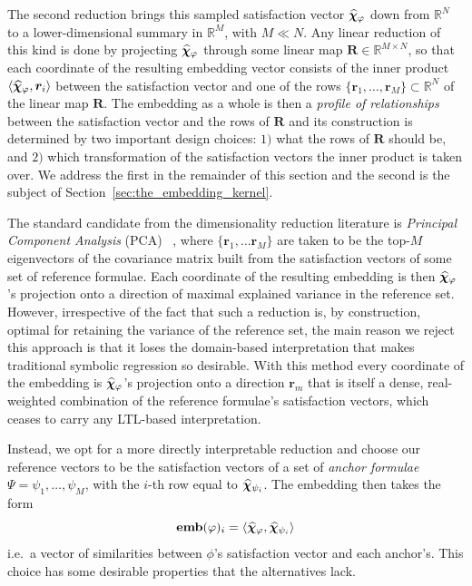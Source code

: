 \documentclass[titlepage,a4paper,11pt]{report}
\begin{document}
    The second reduction brings this sampled satisfaction vector $\bm{\widehat\chi}_\varphi$ down from $\mathbb{R}^N$ to a lower-dimensional summary in $\mathbb{R}^M$, with $M \ll N$. Any linear reduction of this kind is done by projecting $\bm{\widehat\chi}_\varphi$ through some linear map $\bm R \in \mathbb{R}^{M\times N}$, so that each coordinate of the resulting embedding vector consists of the inner product $\langle \bm{\widehat\chi}_\varphi , \bm r_i\rangle$ between the satisfaction vector and one of the rows $\{\bm r_1, \dots, \bm r_M\} \subset \mathbb{R}^N$ of the linear map $\bm R$. The embedding as a whole is then a \emph{profile of relationships} between the satisfaction vector and the rows of $\bm R$ and its construction is determined by two important design choices: $1)$ what the rows of $\bm R$ should be, and $2)$ which transformation of the satisfaction vectors the inner product is taken over. We address the first in the remainder of this section and the second is the subject of Section~\ref{sec:the_embedding_kernel}.

    The standard candidate from the dimensionality reduction literature is \textit{Principal Component Analysis} (PCA) ~\citep{van_der_maaten_dimensionality_2007, hasan_review_2021}, where $\{\bm r_1, \dots \bm r_M \}$ are taken to be the top-$M$ eigenvectors of the covariance matrix built from the satisfaction vectors of some set of reference formulae. Each coordinate of the resulting embedding is then $\bm{\widehat\chi}_\varphi$'s projection onto a direction of maximal explained variance in the reference set. However, irrespective of the fact that such a reduction is, by construction, optimal for retaining the variance of the reference set, the main reason we reject this approach is that it loses the domain-based interpretation that makes traditional symbolic regression so desirable. With this method every coordinate of the embedding is $\bm{\widehat\chi}_\varphi$'s projection onto a direction $\bm r_m$ that is itself a dense, real-weighted combination of the reference formulae's satisfaction vectors, which ceases to carry any LTL-based interpretation.

    Instead, we opt for a more directly interpretable reduction and choose our reference vectors to be the satisfaction vectors of a set of \emph{anchor formulae} $\Psi = {\psi_1, \dots, \psi_M}$, with the $i$-th row equal to $\bm{\widehat\chi}_{\psi_i}$. The embedding then takes the form 
    \begin{equation}
        \textbf{emb}(\varphi)_i = \langle\bm{\widehat\chi}_\varphi, \bm{\widehat\chi}_{\psi_i}\rangle
    \end{equation}
    i.e.\ a vector of similarities between $\phi$'s satisfaction vector and each anchor's. This choice has some desirable properties that the alternatives lack. 
    
\end{document}
